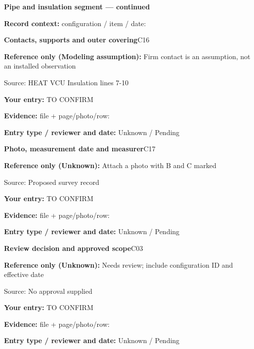 \documentclass[11pt]{article}
\begin{document}
\clearpage
{\large\bfseries Pipe and insulation segment --- continued}\par
\textbf{Record context:} configuration / item / date: \hrulefill\par
\begin{minipage}{\textwidth}\small
{\color{navy}\bfseries Contacts, supports and outer covering}\hfill C16\par
\colorbox{pale}{\parbox{\dimexpr\linewidth-2\fboxsep\relax}{
\textbf{Reference only (Modeling assumption):} Firm contact is an assumption, not an installed observation\par
{\footnotesize Source: HEAT VCU Insulation lines 7-10}}}\par
\textbf{Your entry:} {\color{muted}TO CONFIRM}\enspace\hrulefill\par
{\footnotesize\textbf{Evidence:} file + page/photo/row: \hrulefill\par
\textbf{Entry type / reviewer and date:} Unknown / Pending\par
}\end{minipage}\par\vspace{5pt}
\begin{minipage}{\textwidth}\small
{\color{navy}\bfseries Photo, measurement date and measurer}\hfill C17\par
\colorbox{pale}{\parbox{\dimexpr\linewidth-2\fboxsep\relax}{
\textbf{Reference only (Unknown):} Attach a photo with B and C marked\par
{\footnotesize Source: Proposed survey record}}}\par
\textbf{Your entry:} {\color{muted}TO CONFIRM}\enspace\hrulefill\par
{\footnotesize\textbf{Evidence:} file + page/photo/row: \hrulefill\par
\textbf{Entry type / reviewer and date:} Unknown / Pending\par
}\end{minipage}\par\vspace{5pt}
\begin{minipage}{\textwidth}\small
{\color{navy}\bfseries Review decision and approved scope}\hfill C03\par
\colorbox{pale}{\parbox{\dimexpr\linewidth-2\fboxsep\relax}{
\textbf{Reference only (Unknown):} Needs review; include configuration ID and effective date\par
{\footnotesize Source: No approval supplied}}}\par
\textbf{Your entry:} {\color{muted}TO CONFIRM}\enspace\hrulefill\par
{\footnotesize\textbf{Evidence:} file + page/photo/row: \hrulefill\par
\textbf{Entry type / reviewer and date:} Unknown / Pending\par
}\end{minipage}\par\vspace{5pt}
\end{document}
